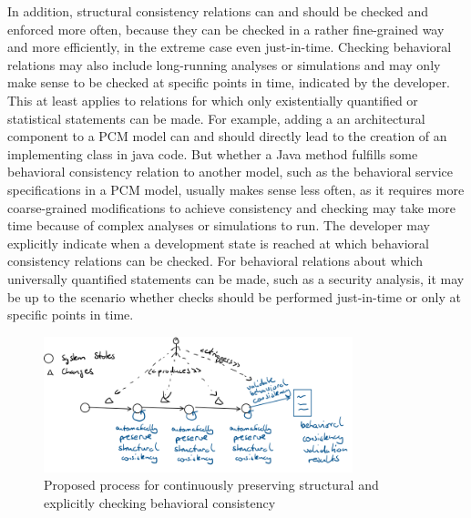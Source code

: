In addition, structural consistency relations can and should be checked and enforced more often, because they can be checked in a rather fine-grained way and more efficiently, in the extreme case even just-in-time.
Checking behavioral relations may also include long-running analyses or simulations and may only make sense to be checked at specific points in time, indicated by the developer.
This at least applies to relations for which only existentially quantified or statistical statements can be made.
For example, adding a an architectural component to a \gls{PCM} model can and should directly lead to the creation of an implementing class in java code. %
But whether a Java method fulfills some behavioral consistency relation to another model, such as the behavioral service specifications in a \gls{PCM} model, usually makes sense less often, as it requires more coarse-grained modifications to achieve consistency and checking may take more time because of complex analyses or simulations to run.
The developer may explicitly indicate when a development state is reached at which behavioral consistency relations can be checked.
For behavioral relations about which universally quantified statements can be made, such as a security analysis, it may be up to the scenario whether checks should be performed just-in-time or only at specific points in time.

\begin{figure}
    \centering
    \includegraphics[width=0.8\textwidth]{figures/prologue/networks/process_structure_behavior.png}
    \caption[Process for preserving structural and behavioral consistency]{Proposed process for continuously preserving structural and explicitly checking behavioral consistency}
    \label{fig:networks:process_structure_behavior}
\end{figure}

